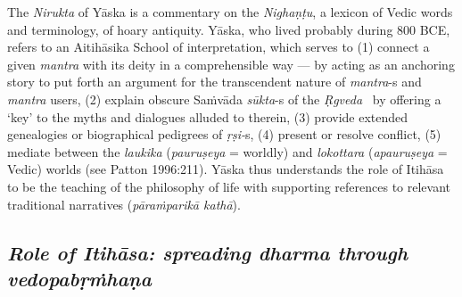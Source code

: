 The \textit{Nirukta} of Yāska is a commentary on the \textit{Nighaṇṭu}, a lexicon of Vedic words and terminology, of hoary antiquity. Yāska, who lived probably during 800 BCE, refers to an Aitihāsika School of interpretation, which serves to (1) connect a given \textit{mantra} with its deity in a comprehensible way — by acting as an anchoring story to put forth an argument for the transcendent nature of \textit{mantra}-s and \textit{mantra} users, (2) explain obscure Saṁvāda \textit{sūkta}-s of the \textit{Ṛgveda}  by offering a ‘key’ to the myths and dialogues alluded to therein, (3) provide extended genealogies or biographical pedigrees of \textit{ṛṣi-}s, (4) present or resolve conflict, (5) mediate between the \textit{laukika} (\textit{pauruṣeya} = worldly) and \textit{lokottara} (\textit{apauruṣeya} = Vedic) worlds (see Patton 1996:211). Yāska thus understands the role of Itihāsa to be the teaching of the philosophy of life with supporting references to relevant traditional narratives (\textit{pāraṁparikā kathā}).


\subsection*{\textit{Role of Itihāsa: spreading dharma through vedopabṛṁhaṇa}}

